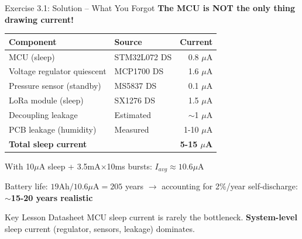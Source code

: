\documentclass[aspectratio=169,11pt]{beamer}
\begin{document}
\begin{frame}{Exercise 3.1: Solution -- What You Forgot}
    \textbf{The MCU is NOT the only thing drawing current!}
    
    \begin{center}
    \begin{tabular}{llr}
        \toprule
        \textbf{Component} & \textbf{Source} & \textbf{Current} \\
        \midrule
        MCU (sleep) & STM32L072 DS & 0.8 $\mu$A \\
        Voltage regulator quiescent & MCP1700 DS & 1.6 $\mu$A \\
        Pressure sensor (standby) & MS5837 DS & 0.1 $\mu$A \\
        LoRa module (sleep) & SX1276 DS & 1.5 $\mu$A \\
        Decoupling leakage & Estimated & $\sim$1 $\mu$A \\
        PCB leakage (humidity) & Measured & 1-10 $\mu$A \\
        \midrule
        \textbf{Total sleep current} & & \textbf{5-15 $\mu$A} \\
        \bottomrule
    \end{tabular}
    \end{center}
    
    \vspace{0.2cm}
    With 10$\mu$A sleep + 3.5mA$\times$10ms bursts: $I_{avg} \approx 10.6\mu$A
    
    Battery life: $19\text{Ah} / 10.6\mu\text{A} = 205$ years $\rightarrow$ accounting for 2\%/year self-discharge: \textbf{$\sim$15-20 years realistic}
    
    \begin{exampleblock}{Key Lesson}
        Datasheet MCU sleep current is rarely the bottleneck. \textbf{System-level} sleep current (regulator, sensors, leakage) dominates.
    \end{exampleblock}
\end{frame}
\end{document}
